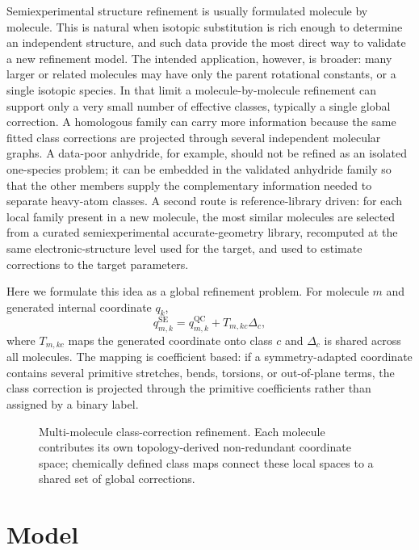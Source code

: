 \documentclass[journal=jpclcd,manuscript=letter]{achemso}
\begin{document}
Semiexperimental structure refinement is usually formulated molecule by molecule.  This is natural when isotopic substitution is rich enough to determine an independent structure, and such data provide the most direct way to validate a new refinement model.  The intended application, however, is broader: many larger or related molecules may have only the parent rotational constants, or a single isotopic species.  In that limit a molecule-by-molecule refinement can support only a very small number of effective classes, typically a single global correction.  A homologous family can carry more information because the same fitted class corrections are projected through several independent molecular graphs.  A data-poor anhydride, for example, should not be refined as an isolated one-species problem; it can be embedded in the validated anhydride family so that the other members supply the complementary information needed to separate heavy-atom classes.  A second route is reference-library driven: for each local family present in a new molecule, the most similar molecules are selected from a curated semiexperimental accurate-geometry library, recomputed at the same electronic-structure level used for the target, and used to estimate corrections to the target parameters.

Here we formulate this idea as a global refinement problem.  For molecule $m$ and generated internal coordinate $q_k$,
\begin{equation}
q_{m,k}^{\mathrm{SE}} =
q_{m,k}^{\mathrm{QC}} + T_{m,kc}\Delta_c ,
\end{equation}
where $T_{m,kc}$ maps the generated coordinate onto class $c$ and $\Delta_c$ is shared across all molecules.  The mapping is coefficient based: if a symmetry-adapted coordinate contains several primitive stretches, bends, torsions, or out-of-plane terms, the class correction is projected through the primitive coefficients rather than assigned by a binary label.

\begin{figure}[H]
\centering
\resizebox{0.96\linewidth}{!}{}
\caption{Multi-molecule class-correction refinement.  Each molecule contributes its own topology-derived non-redundant coordinate space; chemically defined class maps connect these local spaces to a shared set of global corrections.}
\label{fig:model_scheme}
\end{figure}

\section*{Model}
\end{document}
